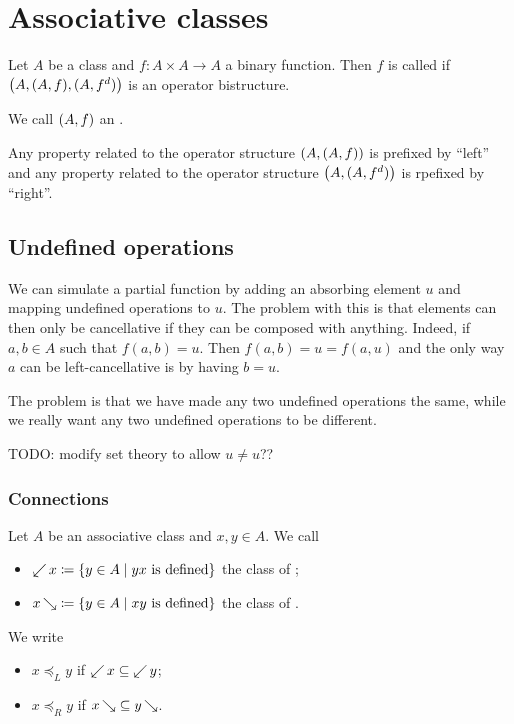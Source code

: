 \chapter{Associative classes}
\begin{definition}
Let $A$ be a class and $f: A\times A\to A$ a binary function. Then $f$ is called  if $\left( A, (A, f), (A, f^d) \right)$ is an operator bistructure.

We call $\left( A, f \right)$ an .
\end{definition}

Any property related to the operator structure $\left( A, (A,f) \right)$ is prefixed by ``left'' and any property related to the operator structure $\left( A, (A, f^d) \right)$ is rpefixed by ``right''.

\section{Undefined operations}
We can simulate a partial function by adding an absorbing element $u$ and mapping undefined operations to $u$. The problem with this is that elements can then only be cancellative if they can be composed with anything. Indeed, if $a,b\in A$ such that $f(a,b) = u$. Then $f(a,b) = u = f(a,u)$ and the only way $a$ can be left-cancellative is by having $b=u$.

The problem is that we have made any two undefined operations the same, while we really want any two undefined operations to be different.

TODO: modify set theory to allow $u\neq u$??

\subsection{Connections}
\begin{definition}
Let $A$ be an associative class and $x,y\in A$. We call
\begin{itemize}
\item $\mathop{\swarrow}x \coloneqq \left\{ y\in A \;\middle|\; \text{$yx$ is defined} \right\}$ the class of ;
\item $x\mathop{\searrow} \coloneqq \left\{ y\in A \;\middle|\; \text{$xy$ is defined} \right\}$ the class of .
\end{itemize}
We write
\begin{itemize}
\item $x \preceq_L y$ if $\mathop{\swarrow}x \subseteq \mathop{\swarrow}y$;
\item $x \preceq_R y$ if $x\mathop{\searrow} \subseteq y\mathop{\searrow}$.
\end{itemize}
\end{definition}

